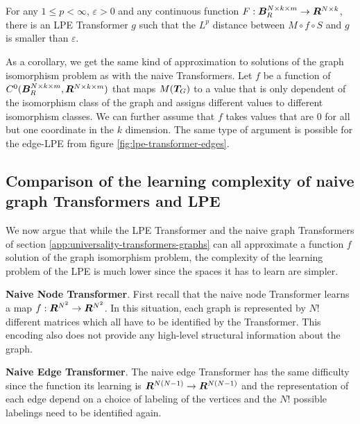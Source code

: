 \documentclass{article}
\newcommand{\xhdr}[1]{{\noindent\bfseries #1}.}
\begin{document}
\begin{proposition}
\label{prop:lpe-expressivity}
For any $1\leq p < \infty$, $\varepsilon>0$ and any continuous function $F: {\bm{B}}_R^{N\times k\times m} \to {\bm{R}}^{N\times k} $, there is an LPE  Transformer $g$ such that the $L^p$ distance between $M\circ f \circ S$ and $g$ is smaller than $\varepsilon$.
\end{proposition}
As a corollary, we get the same kind of approximation to solutions of the graph isomorphism problem as with the naive Transformers.
Let $f$ be a function of $C^0({\bm{B}}_R^{N\times k\times m}, {\bm{R}}^{N\times k\times m})$ that maps $M({\bm{T}}_G)$ to a value that is only dependent of the isomorphism class of the graph and assigns different values to different isomorphism classes. We can further assume that $f$ takes values that are 0 for all but one coordinate in the $k$ dimension. The same type of argument is possible for the edge-LPE from figure \ref{fig:lpe-transformer-edges}.



\subsection{Comparison of the learning complexity of naive graph Transformers and LPE}

We now argue that while the LPE Transformer and the naive graph Transformers of section \ref{app:universality-transformers-graphs} can all approximate a function $f$ solution of the graph isomorphism problem, the complexity of the learning problem of the LPE is much lower since the spaces it has to learn are simpler.

\xhdr{Naive Node Transformer}
    First recall that the naive node Transformer learns a map $f:{\bm{R}}^{N^2} \to {\bm{R}}^{N^2}$. In this situation, each graph is represented by $N!$ different matrices which all have to be identified by the Transformer. This encoding also does not provide any high-level structural information about the graph.

\xhdr{Naive Edge Transformer}
    The naive edge Transformer has the same difficulty since the function its learning is ${\bm{R}}^{N(N-1)} \to {\bm{R}}^{N(N-1)}$ and the representation of each edge depend on a choice of labeling of the vertices and the $N!$ possible labelings need to be identified again. 
\end{document}
